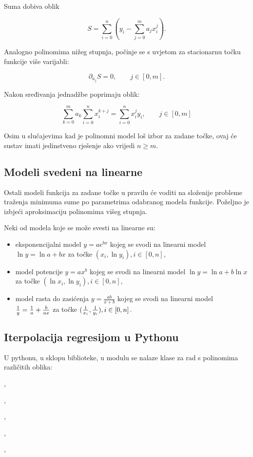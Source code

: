 Suma dobiva oblik

$$
S=\sum_{i=0}^n\left(y_i-\sum_{j=0}^ma_jx_i^j\right).
$$

Analogno polinomima nižeg stupnja, počinje se s uvjetom za stacionarnu točku
funkcije više varijabli:

$$
\partial_{a_j}S=0,\qquad j\in[0,m].
$$

Nakon sređivanja jednadžbe poprimaju oblik:

$$
\sum_{k=0}^ma_k\sum_{i=0}^nx_i^{k+j}=\sum_{i=0}^nx_i^jy_i,\qquad j\in[0,m]
$$

Osim u slučajevima kad je polinomni model loš izbor za zadane točke, ovaj će
sustav imati jedinstveno rješenje ako vrijedi $n\geq m$.

\subsection{Modeli svedeni na linearne}

Ostali modeli funkcija za zadane točke u pravilu će voditi na složenije probleme
traženja minimuma sume po parametrima odabranog modela funkcije. Poželjno je
izbjeći aproksimaciju polinomima višeg stupnja.

Neki od modela koje se može svesti na linearne su:

\begin{itemize}
    \item eksponencijalni model $y=ae^{bx}$ kojeg se svodi na linearni model
    $\ln y = \ln a+bx$ za točke $(x_i,\ln y_i), i\in[0,n]$,
    \item model potencije $y=ax^b$ kojeg se svodi na linearni model $\ln y = \ln
    a+b\ln x$ za točke $(\ln x_i, \ln y_i), i\in[0,n]$,
    \item model rasta do zasićenja $y=\frac{ab}{x+b}$ kojeg se svodi na linearni
    model ${1\over y}={1\over a}+{b\over ax}$ za točke $({1\over x_i}, {1\over
    y_i}), i\in[0,n]$.
\end{itemize}

\newpage

\subsection{Iterpolacija regresijom u Pythonu}

U pythonu, u sklopu  biblioteke, u  modulu se
nalaze klase za rad s polinomima različitih oblika:
\begin{multicols}{6}
    ,
    \columnbreak

    ,
    \columnbreak

    ,
    \columnbreak

    ,
    \columnbreak

    ,
    \columnbreak

\end{multicols}


